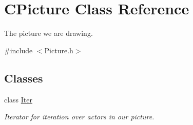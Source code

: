 \hypertarget{class_c_picture}{\section{C\+Picture Class Reference}
\label{class_c_picture}
}


The picture we are drawing.  




{\ttfamily \#include $<$Picture.\+h$>$}

\subsection*{Classes}
\begin{DoxyCompactItemize}
\item 
class \hyperlink{class_c_picture_1_1_iter}{Iter}
\begin{DoxyCompactList}\small\item\em Iterator for iteration over actors in our picture. \end{DoxyCompactList}\end{DoxyCompactItemize}

